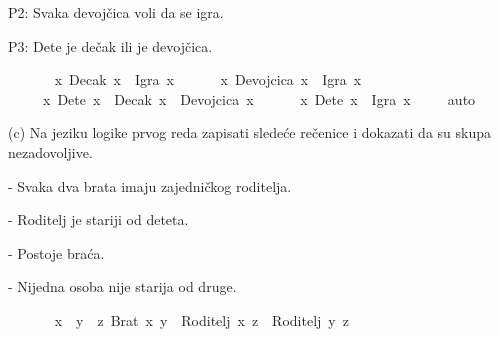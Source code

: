 \begin{isabellebody}
\begin{exercise}[subtitle=Zapisivanje logičkih formula (nastavak)]
\begin{isamarkuptext}
\end{isamarkuptext}\isamarkuptrue%
%
\begin{isamarkuptext}%
P2: Svaka devojčica voli da se igra.%
\end{isamarkuptext}\isamarkuptrue%
%
\begin{isamarkuptext}%
P3: Dete je dečak ili je devojčica.%
\end{isamarkuptext}\isamarkuptrue%
\isamarkupfalse%
\ {\isachardoublequoteopen}\isanewline
\ \ \ \ {\isacharparenleft}{\kern0pt}{\isasymforall}\ x{\isachardot}{\kern0pt}\ Decak\ x\ {\isasymlongrightarrow}\ Igra\ x{\isacharparenright}{\kern0pt}\ {\isasymand}\isanewline
\ \ \ \ {\isacharparenleft}{\kern0pt}{\isasymforall}\ x{\isachardot}{\kern0pt}\ Devojcica\ x\ {\isasymlongrightarrow}\ Igra\ x{\isacharparenright}{\kern0pt}\ {\isasymand}\isanewline
\ \ \ \ {\isacharparenleft}{\kern0pt}{\isasymforall}\ x{\isachardot}{\kern0pt}\ Dete\ x\ {\isasymlongrightarrow}\ Decak\ x\ {\isasymor}\ Devojcica\ x{\isacharparenright}{\kern0pt}\ {\isasymlongrightarrow}\isanewline
\ \ \ \ {\isacharparenleft}{\kern0pt}{\isasymforall}\ x{\isachardot}{\kern0pt}\ Dete\ x\ {\isasymlongrightarrow}\ Igra\ x{\isacharparenright}{\kern0pt}\ {\isachardoublequoteclose}\isanewline
%
\isadelimproof
\ \ %
\endisadelimproof
%
\isatagproof
{}\isamarkupfalse%
\ auto%
\endisatagproof
{\isafoldproof}%
%
\isadelimproof
%
\endisadelimproof
%
\begin{isamarkuptext}%
(c) Na jeziku logike prvog reda zapisati sledeće rečenice i dokazati da su skupa nezadovoljive.%
\end{isamarkuptext}\isamarkuptrue%
%
\begin{isamarkuptext}%
- Svaka dva brata imaju zajedničkog roditelja.%
\end{isamarkuptext}\isamarkuptrue%
%
\begin{isamarkuptext}%
- Roditelj je stariji od deteta.%
\end{isamarkuptext}\isamarkuptrue%
%
\begin{isamarkuptext}%
- Postoje braća.%
\end{isamarkuptext}\isamarkuptrue%
%
\begin{isamarkuptext}%
- Nijedna osoba nije starija od druge.%
\end{isamarkuptext}\isamarkuptrue%
\isamarkupfalse%
\ {\isachardoublequoteopen}\isanewline
\ \ \ \ {\isacharparenleft}{\kern0pt}{\isasymforall}\ x{\isachardot}{\kern0pt}\ {\isasymforall}\ y{\isachardot}{\kern0pt}\ {\isasymexists}\ z{\isachardot}{\kern0pt}\ Brat\ x\ y\ {\isasymlongrightarrow}\ Roditelj\ x\ z\ {\isasymand}\ Roditelj\ y\ z{\isacharparenright}{\kern0pt}\ {\isasymand}\isanewline

\end{exercise}
\end{isabellebody}
